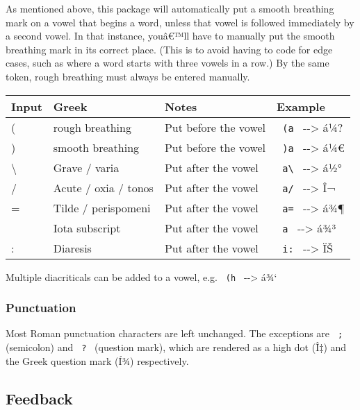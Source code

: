 As mentioned above, this package will automatically put a smooth
breathing mark on a vowel that begins a word, unless that vowel is
followed immediately by a second vowel. In that instance, youâ€™ll have
to manually put the smooth breathing mark in its correct place. (This is
to avoid having to code for edge cases, such as where a word starts with
three vowels in a row.) By the same token, rough breathing must always
be entered manually.

\begin{longtable}[]{@{}llll@{}}
\toprule\noalign{}
Input & Greek & Notes & Example \\
\midrule\noalign{}
\endhead
\bottomrule\noalign{}
\endlastfoot
( & rough breathing & Put before the vowel & \texttt{\ (a\ }
-\/-\textgreater{} á¼? \\
) & smooth breathing & Put before the vowel & \texttt{\ )a\ }
-\/-\textgreater{} á¼€ \\
\textbackslash{} & Grave / varia & Put after the vowel &
\texttt{\ a\textbackslash{}\ } -\/-\textgreater{} á½° \\
/ & Acute / oxia / tonos & Put after the vowel & \texttt{\ a/\ }
-\/-\textgreater{} Î¬ \\
= & Tilde / perispomeni & Put after the vowel & \texttt{\ a=\ }
-\/-\textgreater{} á¾¶ \\
\textbar{} & Iota subscript & Put after the vowel &
\texttt{\ a\textbar{}\ } -\/-\textgreater{} á¾³ \\
: & Diaresis & Put after the vowel & \texttt{\ i:\ } -\/-\textgreater{}
ÏŠ \\
\end{longtable}

Multiple diacriticals can be added to a vowel, e.g.
\texttt{\ (h\textbar{}\ } -\/-\textgreater{} á¾`

\subsubsection{Punctuation}\label{punctuation}

Most Roman punctuation characters are left unchanged. The exceptions are
\texttt{\ ;\ } (semicolon) and \texttt{\ ?\ } (question mark), which are
rendered as a high dot (Î‡) and the Greek question mark (Í¾)
respectively.

\subsection{Feedback}\label{feedback}

